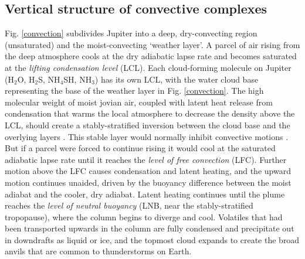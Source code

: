 \documentclass[final,authoryear,5p,times,twocolumn]{elsarticle}
\begin{document}
\subsection{Vertical structure of convective complexes}

Fig. \ref{convection} subdivides Jupiter into a deep, dry-convecting region (unsaturated) and the moist-convecting `weather layer'.  A parcel of air rising from the deep atmosphere cools at the dry adiabatic lapse rate and becomes saturated at the \textit{lifting condensation level} (LCL).  Each cloud-forming molecule on Jupiter (H$_2$O, H$_2$S, NH$_4$SH, NH$_3$) has its own LCL, with the water cloud base representing the base of the weather layer in Fig. \ref{convection}.   The high molecular weight of moist jovian air, coupled with latent heat release from condensation that warms the local atmosphere to decrease the density above the LCL, should create a stably-stratified inversion between the cloud base and the overlying layers \citep[e.g.,][]{98showman, 14sugiyama, 15li}.  This stable layer would normally inhibit convective motions \citep[in practice, the relative humidity of the environment needs to be high enough to permit buoyancy,][]{86stoker}.  But if a parcel were forced to continue rising it would cool at the saturated adiabatic lapse rate until it reaches the \textit{level of free convection} (LFC).  Further motion above the LFC causes condensation and latent heating, and the upward motion continues unaided, driven by the buoyancy difference between the moist adiabat and the cooler, dry adiabat.  Latent heating continues until the plume reaches the \textit{level of neutral buoyancy} (LNB, near the stably-stratified tropopause), where the column begins to diverge and cool.  Volatiles that had been transported upwards in the column are fully condensed and precipitate out in downdrafts as liquid or ice, and the topmost cloud expands to create the broad anvils that are common to thunderstorms on Earth. 
\end{document}
